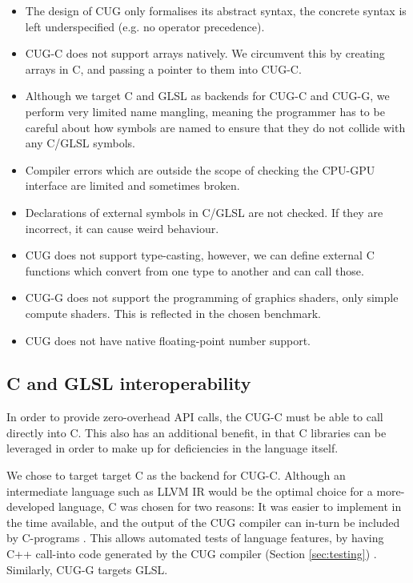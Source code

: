 \documentclass[a4paper,12pt,twoside,openright]{report}
\begin{document}
\begin{itemize}

    \item The design of CUG only formalises its abstract syntax, the concrete
    syntax is left underspecified (e.g. no operator precedence).

    \item CUG-C does not support arrays natively. We circumvent this by
    creating arrays in C, and passing a pointer to them into CUG-C.

    \item Although we target C and GLSL as backends for CUG-C and CUG-G, we
    perform very limited name mangling, meaning the programmer has to be
    careful about how symbols are named to ensure that they do not collide with
    any C/GLSL symbols.

    \item Compiler errors which are outside the scope of checking the CPU-GPU
    interface are limited and sometimes broken.

    \item Declarations of external symbols in C/GLSL are not checked. If they are
    incorrect, it can cause weird behaviour.

    \item CUG does not support type-casting, however, we can define external C
    functions which convert from one type to another and can call those. %

    \item CUG-G does not support the programming of graphics shaders, only
    simple compute shaders. This is reflected in the chosen benchmark.

    \item CUG does not have native floating-point number support.

\end{itemize}

\subsection{C and GLSL interoperability}

In order to provide zero-overhead API calls, the CUG-C must be able to call
directly into C. This also has an additional benefit, in that C libraries can
be leveraged in order to make up for deficiencies in the language itself.

We chose to target target C as the backend for CUG-C. Although an intermediate
language such as LLVM IR would be the optimal choice for a more-developed
language, C was chosen for two reasons: It was easier to implement in the time
available, and the output of the CUG compiler can in-turn be included by
C-programs \cite{ProjectSource}. This allows automated tests of language
features, by having C++ call-into code generated by the CUG compiler (Section
\ref{sec:testing}) \cite{AutomatedTestCode} \cite{AutomatedTestOutput}.
Similarly, CUG-G targets GLSL.
\end{document}
